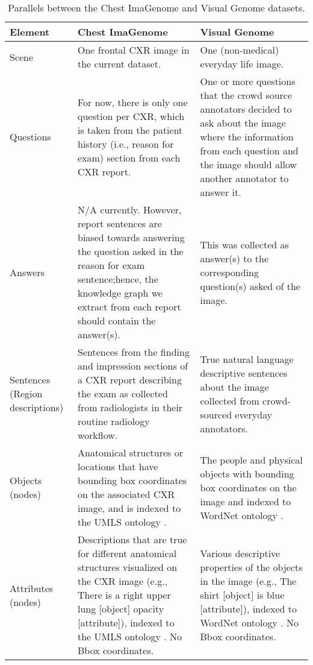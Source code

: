 \begin{table}[!ht]
  \centering
    \caption{Parallels between the Chest ImaGenome and Visual Genome datasets.}
  \label{tab:cg_vg_parallels}
  \footnotesize{
    \begin{tabular}{|p{4em}|p{21em}|p{16em}|}
    \toprule
    \textbf{Element} & \textbf{Chest ImaGenome} & \textbf{Visual Genome} \\
    \midrule
    \midrule
    Scene & One frontal CXR image in the current dataset. & One (non-medical) everyday life image. \\
    \midrule
    Questions & For now, there is only one question per CXR, which is taken from the patient history (i.e., reason for exam) section from each CXR report. & One or more questions that the crowd source annotators decided to ask about the image where the information from each question and the image should allow another annotator to answer it. \\
    \midrule
    Answers & N/A currently. However, report sentences are biased towards answering the question asked in the reason for exam sentence;hence, the knowledge graph we extract from each report should contain the answer(s). & This was collected as answer(s) to the corresponding question(s) asked of the image. \\
    \midrule
    Sentences (Region descriptions) & Sentences from the finding and impression sections of a CXR report describing the exam as collected from radiologists in their routine radiology workflow. & True natural language descriptive sentences about the image collected from crowd-sourced everyday annotators. \\
    \midrule
    Objects (nodes) & Anatomical structures or locations that have bounding box coordinates on the associated CXR image, and is indexed to the UMLS ontology \cite{bodenreider2004unified}. & The people and physical objects with bounding box coordinates on the image and indexed to WordNet ontology \cite{miller1995wordnet}. \\
    \midrule
    Attributes (nodes) & Descriptions that are true for different anatomical structures visualized on the CXR image (e.g., There is a right upper lung [object] opacity [attribute]), indexed to the UMLS ontology \cite{bodenreider2004unified}. No Bbox coordinates. & Various descriptive properties of the objects in the image (e.g., The shirt [object] is blue [attribute]), indexed to WordNet ontology \cite{miller1995wordnet}. No Bbox coordinates. \\

\end{tabular}}
\end{table}
